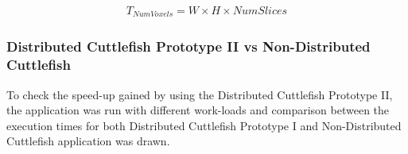 \begin{equation}
\label{eq:NumVoxel}
\begin{aligned}
T_{NumVoxels} = W \times H \times NumSlices
\end{aligned}
\end{equation}


\subsubsection{Distributed Cuttlefish Prototype II vs Non-Distributed Cuttlefish}
To check the speed-up gained by using the Distributed Cuttlefish Prototype II, the application was run with different work-loads and comparison between the execution times for both Distributed Cuttlefish Prototype I and Non-Distributed Cuttlefish application was drawn.


